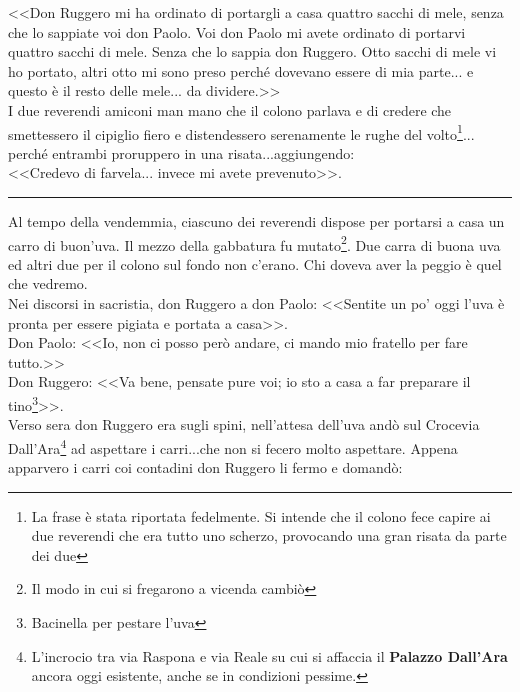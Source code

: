 \indent <<Don Ruggero mi ha ordinato di portargli a casa quattro sacchi di mele, senza che lo sappiate voi don Paolo. Voi don Paolo mi avete ordinato di portarvi quattro sacchi di mele. Senza che lo sappia don Ruggero. Otto sacchi di mele vi ho portato, altri otto mi sono preso perché dovevano essere di mia parte... e questo è il resto delle mele... da dividere.>>\\
\indent I due reverendi amiconi man mano che il colono parlava e di credere che smettessero il cipiglio fiero e distendessero serenamente le rughe del volto\footnote{La frase è stata riportata fedelmente. Si intende che il colono fece capire ai due reverendi che era tutto uno scherzo, provocando una gran risata da parte dei due}... perché entrambi proruppero in una risata...aggiungendo: \\
\indent <<Credevo di farvela... invece mi avete prevenuto>>.
\begin{center}
\rule{1.5cm}{0.4pt}
\end{center}
Al tempo della vendemmia, ciascuno dei reverendi dispose per portarsi a casa un carro di buon'uva. Il mezzo della gabbatura fu mutato\footnote{Il modo in cui si fregarono a vicenda cambiò}. Due carra di buona uva ed altri due per il colono sul fondo non c'erano. Chi doveva aver la peggio è quel che vedremo. \\
\indent Nei discorsi in sacristia, don Ruggero a don Paolo: 
<<Sentite un po' oggi l'uva è pronta per essere pigiata e portata a casa>>.\\
\indent Don Paolo: <<Io, non ci posso però andare, ci mando mio fratello per fare tutto.>>\\
\indent Don Ruggero: <<Va bene, pensate pure voi; io sto a casa a far preparare il tino\footnote{Bacinella per pestare l'uva}>>.\\
\indent Verso sera don Ruggero era sugli spini, nell'attesa dell'uva andò sul Crocevia Dall'Ara\footnote{L'incrocio tra via Raspona e via Reale su cui si affaccia il \textbf{Palazzo Dall'Ara} ancora oggi esistente, anche se in condizioni pessime. } ad aspettare i carri...che non si fecero molto aspettare. Appena apparvero i carri coi contadini don Ruggero li fermo e domandò: \\
